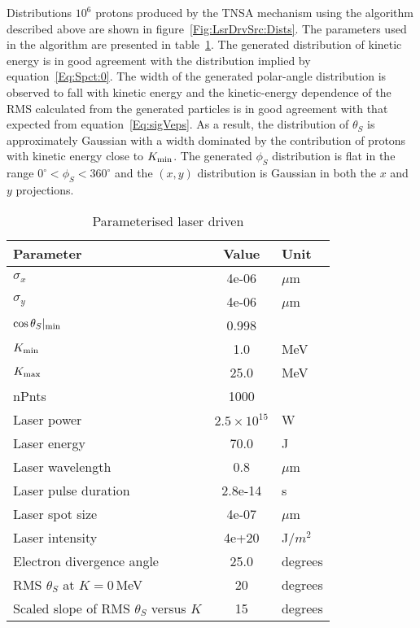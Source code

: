 Distributions $10^6$ protons produced by the TNSA mechanism using the
algorithm described above are shown in
figure~\ref{Fig:LsrDrvSrc:Dists}.
The parameters used in the algorithm are presented in
table~\ref{Tab:Src:Param}.
The generated distribution of kinetic energy is in good agreement with
the distribution implied by equation~\ref{Eq:Spct:0}.
The width of the generated polar-angle distribution is observed to
fall with kinetic energy and the kinetic-energy dependence of the RMS
calculated from the generated particles is in good agreement with that
expected from equation~\ref{Eq:sigVeps}.
As a result, the distribution of $\theta_S$ is approximately Gaussian
with a width dominated by the contribution of protons with kinetic
energy close to $K_{\rm min}$.
The generated $\phi_S$ distribution is flat in the range
$0^\circ < \phi_S < 360^\circ$ and the $(x, y)$ distribution is
Gaussian in both the $x$ and $y$ projections.
\begin{table}
  \caption{Parameterised laser driven}
  \label{Tab:Src:Param}
  \begin{center}
    \begin{tabular}{|l|c|l|}
      \hline
        \textbf{Parameter} & \textbf{Value} & \textbf{Unit} \\ 
        \hline
        $\sigma_x$&4e-06&$\mu$m \\ 
        $\sigma_y$&4e-06&$\mu$m \\ 
        $\cos\theta_S |_{\rm min}$&0.998& \\ 
        $K_{\rm min}$&1.0&MeV \\ 
        $K_{\rm max}$&25.0&MeV \\ 
        nPnts&1000& \\ 
        Laser power&$2.5\times10^{15}$&W \\ 
        Laser energy&70.0&J \\ 
        Laser wavelength&0.8&$\mu$m \\ 
        Laser pulse duration&2.8e-14&s \\ 
        Laser spot size&4e-07&$\mu$m \\ 
        Laser intensity&4e+20&J$/m^2$ \\ 
        Electron divergence angle&25.0&degrees \\
        RMS $\theta_S$ at $K=0$\,MeV & 20 & degrees \\
        Scaled slope of RMS $\theta_S$ versus $K$ & 15 & degrees \\
      \hline
    \end{tabular}
  \end{center}
\end{table}
